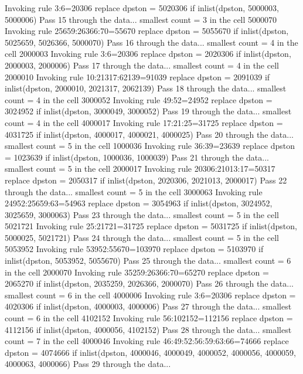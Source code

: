   Invoking rule 3:6=20306
  replace dpston = 5020306 if inlist(dpston, 5000003, 5000006)
Pass 15 through the data...
  smallest count = 3 in the cell      5000070
  Invoking rule 25659:26366:70=55670
  replace dpston = 5055670 if inlist(dpston, 5025659, 5026366, 5000070)
Pass 16 through the data...
  smallest count = 4 in the cell      2000003
  Invoking rule 3:6=20306
  replace dpston = 2020306 if inlist(dpston, 2000003, 2000006)
Pass 17 through the data...
  smallest count = 4 in the cell      2000010
  Invoking rule 10:21317:62139=91039
  replace dpston = 2091039 if inlist(dpston, 2000010, 2021317, 2062139)
Pass 18 through the data...
  smallest count = 4 in the cell      3000052
  Invoking rule 49:52=24952
  replace dpston = 3024952 if inlist(dpston, 3000049, 3000052)
Pass 19 through the data...
  smallest count = 4 in the cell      4000017
  Invoking rule 17:21:25=31725
  replace dpston = 4031725 if inlist(dpston, 4000017, 4000021, 4000025)
Pass 20 through the data...
  smallest count = 5 in the cell      1000036
  Invoking rule 36:39=23639
  replace dpston = 1023639 if inlist(dpston, 1000036, 1000039)
Pass 21 through the data...
  smallest count = 5 in the cell      2000017
  Invoking rule 20306:21013:17=50317
  replace dpston = 2050317 if inlist(dpston, 2020306, 2021013, 2000017)
Pass 22 through the data...
  smallest count = 5 in the cell      3000063
  Invoking rule 24952:25659:63=54963
  replace dpston = 3054963 if inlist(dpston, 3024952, 3025659, 3000063)
Pass 23 through the data...
  smallest count = 5 in the cell      5021721
  Invoking rule 25:21721=31725
  replace dpston = 5031725 if inlist(dpston, 5000025, 5021721)
Pass 24 through the data...
  smallest count = 5 in the cell      5053952
  Invoking rule 53952:55670=103970
  replace dpston = 5103970 if inlist(dpston, 5053952, 5055670)
Pass 25 through the data...
  smallest count = 6 in the cell      2000070
  Invoking rule 35259:26366:70=65270
  replace dpston = 2065270 if inlist(dpston, 2035259, 2026366, 2000070)
Pass 26 through the data...
  smallest count = 6 in the cell      4000006
  Invoking rule 3:6=20306
  replace dpston = 4020306 if inlist(dpston, 4000003, 4000006)
Pass 27 through the data...
  smallest count = 6 in the cell      4102152
  Invoking rule 56:102152=112156
  replace dpston = 4112156 if inlist(dpston, 4000056, 4102152)
Pass 28 through the data...
  smallest count = 7 in the cell      4000046
  Invoking rule 46:49:52:56:59:63:66=74666
  replace dpston = 4074666 if inlist(dpston, 4000046, 4000049, 4000052, 4000056, 4000059, 4000063, 4000066)
Pass 29 through the data...
